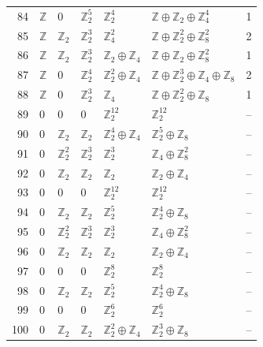 \documentclass[10pt]{article}
\begin{document}
\begin{longtable}{rlllllr}
84 & $\mathbb{Z}$ & $0$ & $\mathbb{Z}_{2}^{5}$ & $\mathbb{Z}_{2}^{4}$ & $\mathbb{Z}\oplus \mathbb{Z}_{2}\oplus \mathbb{Z}_{4}^{4}$ & 1 \\
85 & $\mathbb{Z}$ & $\mathbb{Z}_{2}$ & $\mathbb{Z}_{2}^{3}$ & $\mathbb{Z}_{4}^{2}$ & $\mathbb{Z}\oplus \mathbb{Z}_{2}^{2}\oplus \mathbb{Z}_{8}^{2}$ & 2 \\
86 & $\mathbb{Z}$ & $\mathbb{Z}_{2}$ & $\mathbb{Z}_{2}^{3}$ & $\mathbb{Z}_{2}\oplus \mathbb{Z}_{4}$ & $\mathbb{Z}\oplus \mathbb{Z}_{2}\oplus \mathbb{Z}_{8}^{2}$ & 1 \\
87 & $\mathbb{Z}$ & $0$ & $\mathbb{Z}_{2}^{4}$ & $\mathbb{Z}_{2}^{2}\oplus \mathbb{Z}_{4}$ & $\mathbb{Z}\oplus \mathbb{Z}_{2}^{3}\oplus \mathbb{Z}_{4}\oplus \mathbb{Z}_{8}$ & 2 \\
88 & $\mathbb{Z}$ & $0$ & $\mathbb{Z}_{2}^{3}$ & $\mathbb{Z}_{4}$ & $\mathbb{Z}\oplus \mathbb{Z}_{2}^{2}\oplus \mathbb{Z}_{8}$ & 1 \\
89 & $0$ & $0$ & $0$ & $\mathbb{Z}_{2}^{12}$ & $\mathbb{Z}_{2}^{12}$ & -- \\
90 & $0$ & $\mathbb{Z}_{2}$ & $\mathbb{Z}_{2}$ & $\mathbb{Z}_{2}^{4}\oplus \mathbb{Z}_{4}$ & $\mathbb{Z}_{2}^{5}\oplus \mathbb{Z}_{8}$ & -- \\
91 & $0$ & $\mathbb{Z}_{2}^{2}$ & $\mathbb{Z}_{2}^{3}$ & $\mathbb{Z}_{2}^{3}$ & $\mathbb{Z}_{4}\oplus \mathbb{Z}_{8}^{2}$ & -- \\
92 & $0$ & $\mathbb{Z}_{2}$ & $\mathbb{Z}_{2}$ & $\mathbb{Z}_{2}$ & $\mathbb{Z}_{2}\oplus \mathbb{Z}_{4}$ & -- \\
93 & $0$ & $0$ & $0$ & $\mathbb{Z}_{2}^{12}$ & $\mathbb{Z}_{2}^{12}$ & -- \\
94 & $0$ & $\mathbb{Z}_{2}$ & $\mathbb{Z}_{2}$ & $\mathbb{Z}_{2}^{5}$ & $\mathbb{Z}_{2}^{4}\oplus \mathbb{Z}_{8}$ & -- \\
95 & $0$ & $\mathbb{Z}_{2}^{2}$ & $\mathbb{Z}_{2}^{3}$ & $\mathbb{Z}_{2}^{3}$ & $\mathbb{Z}_{4}\oplus \mathbb{Z}_{8}^{2}$ & -- \\
96 & $0$ & $\mathbb{Z}_{2}$ & $\mathbb{Z}_{2}$ & $\mathbb{Z}_{2}$ & $\mathbb{Z}_{2}\oplus \mathbb{Z}_{4}$ & -- \\
97 & $0$ & $0$ & $0$ & $\mathbb{Z}_{2}^{8}$ & $\mathbb{Z}_{2}^{8}$ & -- \\
98 & $0$ & $\mathbb{Z}_{2}$ & $\mathbb{Z}_{2}$ & $\mathbb{Z}_{2}^{5}$ & $\mathbb{Z}_{2}^{4}\oplus \mathbb{Z}_{8}$ & -- \\
99 & $0$ & $0$ & $0$ & $\mathbb{Z}_{2}^{6}$ & $\mathbb{Z}_{2}^{6}$ & -- \\
100 & $0$ & $\mathbb{Z}_{2}$ & $\mathbb{Z}_{2}$ & $\mathbb{Z}_{2}^{2}\oplus \mathbb{Z}_{4}$ & $\mathbb{Z}_{2}^{3}\oplus \mathbb{Z}_{8}$ & -- \\

\end{longtable}
\end{document}
